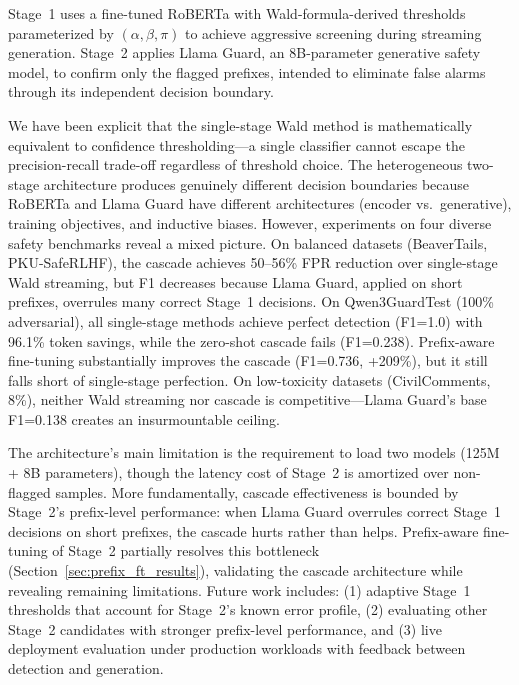 \documentclass[acmtjournal, acmnowidth]{acmart}
\theoremstyle{definition}
\begin{document}
Stage~1 uses a fine-tuned RoBERTa with Wald-formula-derived thresholds parameterized by $(\alpha, \beta, \pi)$ to achieve aggressive screening during streaming generation. Stage~2 applies Llama Guard, an 8B-parameter generative safety model, to confirm only the flagged prefixes, intended to eliminate false alarms through its independent decision boundary.

We have been explicit that the single-stage Wald method is mathematically equivalent to confidence thresholding---a single classifier cannot escape the precision-recall trade-off regardless of threshold choice. The heterogeneous two-stage architecture produces genuinely different decision boundaries because RoBERTa and Llama Guard have different architectures (encoder vs.\ generative), training objectives, and inductive biases. However, experiments on four diverse safety benchmarks reveal a mixed picture. On balanced datasets (BeaverTails, PKU-SafeRLHF), the cascade achieves 50--56\% FPR reduction over single-stage Wald streaming, but F1 decreases because Llama Guard, applied on short prefixes, overrules many correct Stage~1 decisions. On Qwen3GuardTest (100\% adversarial), all single-stage methods achieve perfect detection (F1=1.0) with 96.1\% token savings, while the zero-shot cascade fails (F1=0.238). Prefix-aware fine-tuning substantially improves the cascade (F1=0.736, +209\%), but it still falls short of single-stage perfection. On low-toxicity datasets (CivilComments, 8\%), neither Wald streaming nor cascade is competitive---Llama Guard's base F1=0.138 creates an insurmountable ceiling.

The architecture's main limitation is the requirement to load two models (125M + 8B parameters), though the latency cost of Stage~2 is amortized over non-flagged samples. More fundamentally, cascade effectiveness is bounded by Stage~2's prefix-level performance: when Llama Guard overrules correct Stage~1 decisions on short prefixes, the cascade hurts rather than helps. Prefix-aware fine-tuning of Stage~2 partially resolves this bottleneck (Section~\ref{sec:prefix_ft_results}), validating the cascade architecture while revealing remaining limitations. Future work includes: (1) adaptive Stage~1 thresholds that account for Stage~2's known error profile, (2) evaluating other Stage~2 candidates with stronger prefix-level performance, and (3) live deployment evaluation under production workloads with feedback between detection and generation.

\end{document}
